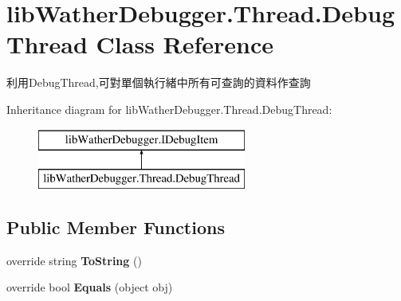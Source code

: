 \hypertarget{classlib_wather_debugger_1_1_thread_1_1_debug_thread}{\section{lib\+Wather\+Debugger.\+Thread.\+Debug\+Thread Class Reference}
\label{classlib_wather_debugger_1_1_thread_1_1_debug_thread}
}


利用\+Debug\+Thread,可對單個執行緒中所有可查詢的資料作查詢  


Inheritance diagram for lib\+Wather\+Debugger.\+Thread.\+Debug\+Thread\+:\begin{figure}[H]
\begin{center}
\leavevmode
\includegraphics[height=2.000000cm]{classlib_wather_debugger_1_1_thread_1_1_debug_thread}
\end{center}
\end{figure}
\subsection*{Public Member Functions}
\begin{DoxyCompactItemize}
\item 
\hypertarget{classlib_wather_debugger_1_1_thread_1_1_debug_thread_a198d7c877ea104affa8937e74c68875d}{override string {\bfseries To\+String} ()}\label{classlib_wather_debugger_1_1_thread_1_1_debug_thread_a198d7c877ea104affa8937e74c68875d}

\item 
\hypertarget{classlib_wather_debugger_1_1_thread_1_1_debug_thread_a78127157ace3255b4f8abdd692ca932a}{override bool {\bfseries Equals} (object obj)}\label{classlib_wather_debugger_1_1_thread_1_1_debug_thread_a78127157ace3255b4f8abdd692ca932a}

\end{DoxyCompactItemize}
